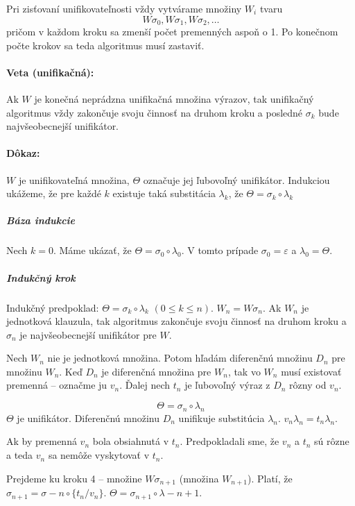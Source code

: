 \begin{poznamka}
    Pri zisťovaní unifikovateľnosti vždy vytvárame množiny $W_i$ tvaru
    \begin{equation*}
        W\sigma_0, W\sigma_1, W\sigma_2, \dots
    \end{equation*}
    pričom v každom kroku sa zmenší počet premenných aspoň o 1.
    Po konečnom počte krokov sa teda algoritmus musí zastaviť.
\end{poznamka}

\startFIXME
\paragraph{Veta (unifikačná):} Ak $W$ je konečná neprádzna unifikačná množina
výrazov, tak unifikačný algoritmus vždy zakončuje svoju činnosť na druhom kroku
a posledné $\sigma_k$ bude najvšeobecnejší unifikátor.

\paragraph{Dôkaz:} $W$ je unifikovateľná množina, $\Theta$ označuje jej
ľubovoľný unifikátor. Indukciou ukážeme, že pre každé $k$ existuje taká
substitácia $\lambda_k$, že $\Theta = \sigma_k \circ \lambda_k$

\subparagraph{Báza indukcie} Nech $k = 0$. Máme ukázať, že $\Theta = \sigma_0
\circ \lambda_0$. V tomto prípade $\sigma_0 = \varepsilon$ a $\lambda_0 =
\Theta$.

\subparagraph{Indukčný krok} Indukčný predpoklad: $\Theta = \sigma_k \circ
\lambda_k$ $(0 \leq k \leq n)$. $W_n = W\sigma_n$. Ak $W_n$ je jednotková
klauzula, tak algoritmus zakončuje svoju činnosť na druhom kroku a $\sigma_n$ je
najvšeobecnejší unifikátor pre $W$. 
\par Nech $W_n$ nie je jednotková množina. Potom hľadám diferenčnú množinu $D_n
$ pre množinu $W_n$. Keď $D_n$ je diferenčná množina pre $W_n$, tak vo $W_n$
musí existovať premenná -- označme ju $v_n$. Ďalej nech $t_n$ je ľubovoľný výraz
z $D_n$ rôzny od $v_n$.

$$\Theta = \sigma_n \circ \lambda_n$$ 
$\Theta$ je unifikátor. Diferenčnú množinu $D_n$ unifikuje substitúcia
$\lambda_n$. $v_n \lambda_n = t_n \lambda_n$.

\par Ak by premenná $v_n$ bola obsiahnutá v $t_n$. Predpokladali sme, že $v_n$ a
$t_n$ sú rôzne a teda $v_n$ sa nemôže vyskytovať v $t_n$.

\par Prejdeme ku kroku 4 -- množine $W\sigma_{n+1}$ (množina $W_{n+1}$). Platí,
že $\sigma_{n+1} = \sigma-n \circ \{ t_n/v_n \}$. $\Theta = \sigma_{n+1} \circ
\lambda-{n+1}$.


